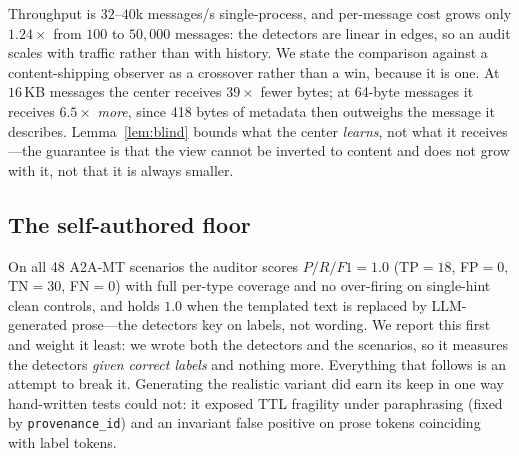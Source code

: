 \documentclass[conference,compsoc]{IEEEtran}
\begin{document}
Throughput is $32$--$40$k messages/s single-process, and per-message cost grows
only $1.24\times$ from $100$ to $50{,}000$ messages: the detectors are linear in
edges, so an audit scales with traffic rather than with history. We state the
comparison against a content-shipping observer as a crossover rather than a win,
because it is one. At $16$\,KB messages the center receives $39\times$ fewer bytes;
at 64-byte messages it receives $6.5\times$ \emph{more}, since 418 bytes of metadata
then outweighs the message it describes. Lemma~\ref{lem:blind} bounds what the
center \emph{learns}, not what it receives---the guarantee is that the view cannot
be inverted to content and does not grow with it, not that it is always smaller.

\subsection{The self-authored floor}
On all 48 A2A-MT scenarios the auditor scores $P/R/F1=1.0$ (TP$=18$, FP$=0$,
TN$=30$, FN$=0$) with full per-type coverage and no over-firing on single-hint
clean controls, and holds $1.0$ when the templated text is replaced by
LLM-generated prose---the detectors key on labels, not wording. We report this
first and weight it least: we wrote both the detectors and the scenarios, so it
measures the detectors \emph{given correct labels} and nothing more. Everything
that follows is an attempt to break it. Generating the realistic variant did earn
its keep in one way hand-written tests could not: it exposed TTL fragility under
paraphrasing (fixed by \texttt{provenance\_id}) and an invariant false positive on
prose tokens coinciding with label tokens.
\end{document}
